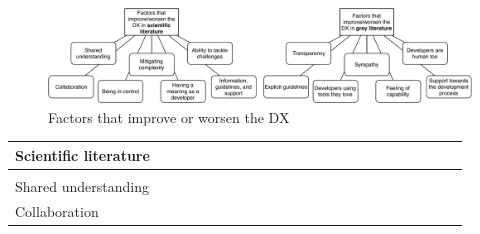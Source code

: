 \documentclass[english, 12pt, a4paper, sci, utf8, a-1b, online]{aaltothesis}
\begin{document}
\begin{figure}[h]
  \begin{center}
    \includegraphics[width=\textwidth]{factors-that-improve-worsen-the-dx.pdf}
  \end{center}
  \captionsetup{width=0.6\textwidth}
  \caption{Factors that improve or worsen the DX}
  \label{figure:factors-that-improve-worsen-the-dx}
\end{figure}

\renewcommand{\arraystretch}{1.5}
\begin{center}
  \begin{longtable}{p{0.3\linewidth}p{0.6\linewidth}}
    \textbf{Scientific literature}                                                                                                                                                                                                                                                                                                                                         \\
    \hline                                                                                                                                                                                                                                                                                                                                                                 \\
    Shared understanding                    & \textcite{how-developers-experience-team-performance} \newline \textcite{paw} \newline \textcite{api-designers} \newline \textcite{fontao2016mseco}                                                                                                                                                                          \\
    Collaboration                           & \textcite{design-framework-enhancing} \newline \textcite{entering-an-ecosystem} \newline \textcite{exploring-peopleware-in-cd} \newline \textcite{romano2018effect} \newline \textcite{ollis2019helping} \newline \textcite{oran2017set} \newline \textcite{on-the-unhappiness} \newline \textcite{open-service-innovation} \\

\end{longtable}
\end{center}
\end{document}
